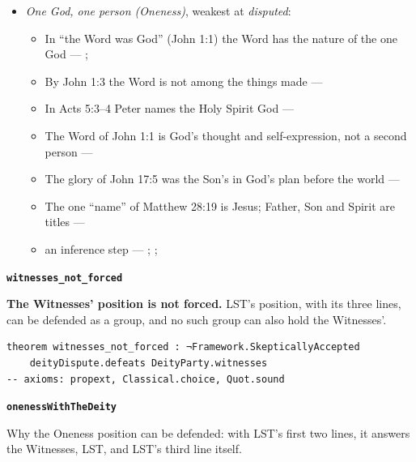 \documentclass[11pt,paper=\testimonypaper,DIV=13,parskip=false]{scrartcl}
\begin{document}
\begin{itemize}
\begin{itemize}
\item In Matthew 28:19 three are named, and the one name is theirs together --- \cite[3, The Triune God]{kibbey-living-systematic-theology-2026}
\end{itemize}
\item \emph{One God, one person (Oneness)}, weakest at \emph{disputed}:
\begin{itemize}
\item In “the Word was God” (John 1:1) the Word has the nature of the one God --- \cite{harner-qualitative-anarthrous-1973}; \cite[3, The Triune God]{kibbey-living-systematic-theology-2026}
\item By John 1:3 the Word is not among the things made --- \cite[Tractates on John I.11]{schaff-nicene-post-nicene-fathers-1-7}
\item In Acts 5:3–4 Peter names the Holy Spirit God --- \cite[198]{calvin-commentary-acts-1844}
\item The Word of John 1:1 is God’s thought and self-expression, not a second person --- \cite[ch. 4 and 8, on John 1:1]{bernard-oneness-of-god-1983}
\item The glory of John 17:5 was the Son’s in God’s plan before the world --- \cite[ch. 8, The Preexistence of Jesus]{bernard-oneness-of-god-1983}
\item The one “name” of Matthew 28:19 is Jesus; Father, Son and Spirit are titles --- \cite[ch. 6, Matthew 28:19]{bernard-oneness-of-god-1983}
\item an inference step --- \cite[3, The Triune God]{kibbey-living-systematic-theology-2026}; \cite[ch. 4, Conclusion]{bernard-oneness-of-god-1983}; \cite[17--19]{buzzard-caveat-lector-2001}
\end{itemize}
\end{itemize}
\par\medskip\noindent\textbf{\texttt{witnesses\_\allowbreak{}not\_\allowbreak{}forced}}\par\nobreak\noindent
\textbf{The Witnesses’ position is not forced.} LST’s position, with its three lines, can be defended as a group, and no such group can also hold the Witnesses’.

{\small\begin{verbatim}
theorem witnesses_not_forced : ¬Framework.SkepticallyAccepted
    deityDispute.defeats DeityParty.witnesses
-- axioms: propext, Classical.choice, Quot.sound
\end{verbatim}}
\par\medskip\noindent\textbf{\texttt{oneness\allowbreak{}With\allowbreak{}The\allowbreak{}Deity}}\par\nobreak\noindent
Why the Oneness position can be defended: with LST’s first two lines, it answers the Witnesses, LST, and LST’s third line itself.
\end{document}
